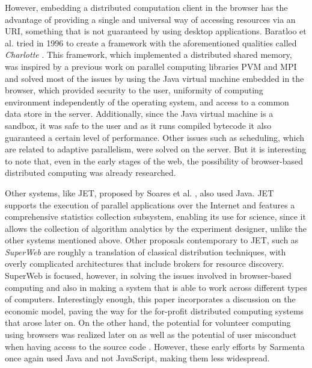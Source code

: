 \documentclass{sig-alternate}
\begin{document}
However, embedding a
distributed computation client in the browser has the advantage of
providing a single and universal way of accessing resources via an
URI, something that is not guaranteed by using desktop applications. 
Baratloo et al. tried in 1996 to create a framework with
the aforementioned qualities called {\em Charlotte}
\cite{baratloo1999charlotte}. This framework, which implemented a
distributed shared memory, was inspired by a previous work
on parallel computing libraries PVM and MPI and solved most of the issues by
using the Java virtual machine embedded in the browser,
which provided
security to the user, uniformity of computing environment
independently of the operating system, and access to a common data store in the
server. Additionally, since the Java virtual machine is a sandbox, it was safe to the user
and as it runs compiled bytecode it also guaranteed a certain level of
performance. %
Other issues such as scheduling, which are related to adaptive 
parallelism, were solved on the server. But it is interesting to note that,
even in the early stages of the web, the possibility of
browser-based distributed computing was already researched. 


Other systems, like JET, proposed by Soares et
al. \cite{soares1998get}, also used Java. JET supports
the execution of parallel applications over the Internet and features
a comprehensive statistics collection subsystem, enabling its use for science, %
since it allows %
the collection of algorithm analytics by the
experiment designer, unlike the other systems mentioned
above. Other proposals contemporary to JET, such as {\em SuperWeb}
\cite{alexandrov1997superweb} are roughly a translation of classical
distribution techniques, with overly complicated architectures that include
brokers for resource discovery. SuperWeb is focused,
however, in solving the
issues involved in browser-based computing and also in making a system
that is able to work across different types of computers. Interestingly enough, this
paper incorporates a discussion on the economic model, paving the way
for the for-profit distributed computing systems that arose later on. 
On the other hand, the potential for volunteer computing using
browsers was realized
later on \cite{sarmenta-bayanihan} as well as the potential of
user misconduct when having access to the source code \cite{sarmenta-sabotagetolerance}. 
However, these early efforts by
Sarmenta once again used Java and not JavaScript, making them %
less widespread.
\end{document}
